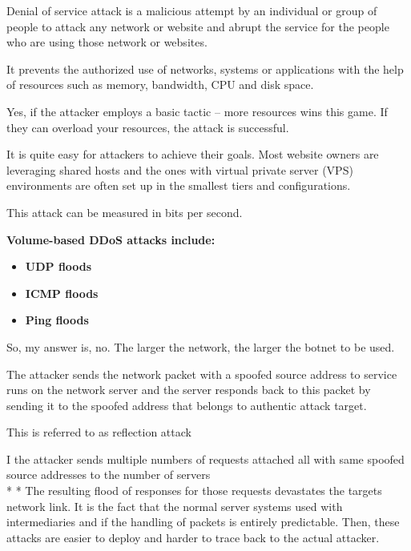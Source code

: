 \documentclass[../CIT288SecurityResearchNotebook.tex]{subfiles}
\begin{document}
Denial of service attack is a malicious attempt by an individual or group 
of people to attack any network or website and abrupt the service for the 
people who are using those network or websites.

It prevents the authorized use of networks, systems or applications 
with the help of resources such as memory, bandwidth, CPU and disk space.



Yes, if the attacker employs a basic tactic – more resources wins this game. 
If they can overload your resources, the attack is successful.

It is quite easy for attackers to achieve their goals. Most website 
owners are leveraging shared hosts and the ones with virtual private 
server (VPS) environments are often set up in the smallest 
tiers and configurations.

This attack can be measured in bits per second.

\begin{center}
{\bf{Volume-based DDoS attacks include:}}
\end{center}
\begin{itemize}
	\item{\bf{UDP floods}} 
	\item{\bf{ICMP floods}} 
	\item{\bf{Ping floods}} 
\end{itemize}

So, my answer is, no. The larger the network, the larger the botnet to be used.



The attacker sends the network packet with a spoofed source address to 
service runs on the network server and the server responds back to this 
packet by sending it to the spoofed address that belongs to authentic 
attack target. 

This is referred to as reflection attack



\noindent* I the attacker sends multiple numbers of requests attached all with same
spoofed source addresses to the number of servers
\\* * The resulting flood of responses for those requests devastates the 
targets network link. It is the fact that the normal server systems used 
with intermediaries and if the handling of packets is entirely predictable. 
Then, these attacks are easier to deploy and harder to trace back to the 
actual attacker.
\end{document}
